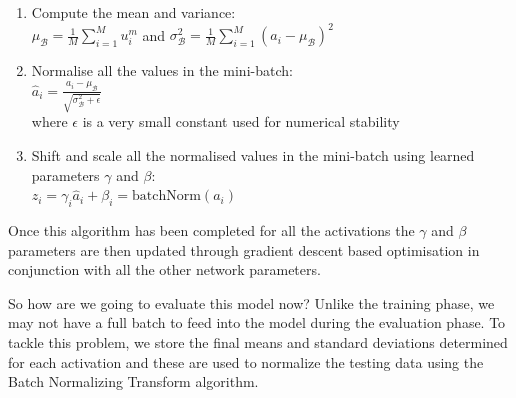 {{\begin{enumerate}
    \item Compute the mean and variance:\\
    $\mu_\mathcal{B} = \frac{1}{M} \sum_{i=1}^{M} u_i^m$ 
    \+ \+ \+ and \+ \+ \+
    $\sigma_\mathcal{B}^2 = \frac{1}{M}\sum_{i=1}^M (a_i - \mu_\mathcal{B})^2$
    \item Normalise all the values in the mini-batch:\\
    $\hat a_i = \frac{a_i - \mu_\mathcal{B}}{\sqrt{\sigma_\mathcal{B}^2 + \epsilon}}$\\
    where $\epsilon$ is a very small constant used for numerical stability
    \item Shift and scale all the normalised values in the mini-batch using learned parameters $\gamma$ and $\beta$:\\
    $z_i = \gamma_i \hat a_i + \beta_i = \text{batchNorm}(a_i)$
\end{enumerate}

Once this algorithm has been completed for all the activations the $\gamma$ and $\beta$ parameters are then updated through gradient descent based optimisation in conjunction with all the other network parameters.

So how are we going to evaluate this model now? Unlike the training phase, we may not have a full batch to feed into the model during the evaluation phase. To tackle this problem, we store the final means and standard deviations determined for each activation and these are used to normalize the testing data using the Batch Normalizing Transform algorithm.


}
}

